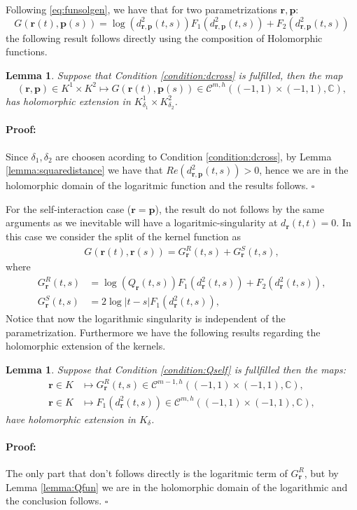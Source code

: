 \documentclass{article}
\newtheorem{lemma}[theorem]{Lemma}
\newenvironment{proof}{\paragraph{Proof:}}{\hfill$\square$}
\newcommand{\IC}{{\mathbb C}}
\newcommand{\bp}{{\bm p}}
\newcommand{\cmspaceh}[4]{\mathcal{C}^{#1,#2} \left( #3, #4 \right)}
\newcommand{\br}{\bm{r}}
\newcommand{\iinterv}{(-1,1)\times(-1,1)}
\begin{document}
Following \eqref{eq:funsolgen}, we have that for two parametrizations $\br,\bp$: 
$$
G(\br(t),\bp(s)) = \log(d^2_{\br,\bp}(t,s)) F_1(d^2_{\br,\bp}(t,s))+F_2(d^2_{\br,\bp}(t,s))
$$
the following result follows directly using the composition of Holomorphic functions. 
\begin{lemma}
\label{lemma:crosskernel}
Suppose that Condition \ref{condition:dcross} is fulfilled, then the map 
$$
(\br,\bp) \in K^1 \times K^2 \mapsto G(\br(t),\bp(s)) \in \cmspaceh{m}{h}{\iinterv}{\IC},
$$
has holomorphic extension in $K^1_{\delta_1} \times K^2_{\delta_2}$.
\end{lemma}
\begin{proof}
Since $\delta_1,\delta_2$ are choosen acording to Condition \ref{condition:dcross}, by Lemma \ref{lemma:squaredistance} we have that $Re(d_{\br,\bp}^2(t,s)) >0$, hence we are in the holomorphic domain of the logaritmic function and the results follows. 
\end{proof}

For the self-interaction case ($\br=\bp$), the result do not follows by the same arguments as we inevitable will have a logaritmic-singularity at $d_{\br}(t,t)=0$. In this case we consider the split of the kernel function as 
\begin{align}
\label{eq:kernelsplit}
G(\br(t),\br(s) ) = G_{\br}^R(t,s)+G_{\br}^S(t,s),
\end{align}
where 
\begin{align}
\label{eq:GR}
G_{\br}^R(t,s) &= \log(Q_{\br}(t,s)) F_1(d^2_{\br}(t,s))+F_2(d^2_{\br}(t,s)),\\
\label{eq:GS}
G_{\br}^S(t,s) &= 2\log|t-s| F_1(d^2_{\br}(t,s)),
\end{align}
Notice that now the logarithmic singularity is independent of the parametrization. Furthermore we have the following results regarding the holomorphic extension of the kernels. 
\begin{lemma}
\label{lemma:selfkernel}
Suppose that Condition \ref{condition:Qself} is fullfilled then the maps: 
\begin{align*}
\br \in K &\mapsto G_{\br}^R(t,s) \in \cmspaceh{m-1}{h}{\iinterv}{\IC},\\
\br \in K &\mapsto F_1(d^2_{\br}(t,s)) \in \cmspaceh{m}{h}{\iinterv}{\IC},
\end{align*}
have holomorphic extension in $K_\delta$.
\end{lemma}
\begin{proof}
The only part that don't follows directly is the logaritmic term of $G_{\br}^R$, but by Lemma \ref{lemma:Qfun} we are in the holomorphic domain of the logarithmic and the conclusion follows. 
\end{proof}
\end{document}
